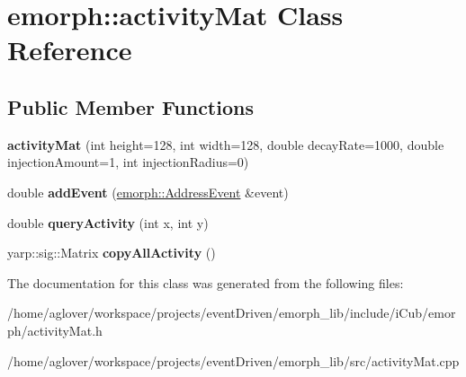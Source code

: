 \hypertarget{classemorph_1_1activityMat}{\section{emorph\-:\-:activity\-Mat Class Reference}
\label{classemorph_1_1activityMat}
}
\subsection*{Public Member Functions}
\begin{DoxyCompactItemize}
\item 
\hypertarget{classemorph_1_1activityMat_aa691fac5518d0aebbf478ca608c0eea5}{{\bfseries activity\-Mat} (int height=128, int width=128, double decay\-Rate=1000, double injection\-Amount=1, int injection\-Radius=0)}\label{classemorph_1_1activityMat_aa691fac5518d0aebbf478ca608c0eea5}

\item 
\hypertarget{classemorph_1_1activityMat_a6d9bad36055b34b570b9e95ba7db3e8d}{double {\bfseries add\-Event} (\hyperlink{classemorph_1_1AddressEvent}{emorph\-::\-Address\-Event} \&event)}\label{classemorph_1_1activityMat_a6d9bad36055b34b570b9e95ba7db3e8d}

\item 
\hypertarget{classemorph_1_1activityMat_a017a37a8eaba4b23acbc7e8a8f5de528}{double {\bfseries query\-Activity} (int x, int y)}\label{classemorph_1_1activityMat_a017a37a8eaba4b23acbc7e8a8f5de528}

\item 
\hypertarget{classemorph_1_1activityMat_a8bd6d788a299ebaf8da6dd0ccfb5ddb3}{yarp\-::sig\-::\-Matrix {\bfseries copy\-All\-Activity} ()}\label{classemorph_1_1activityMat_a8bd6d788a299ebaf8da6dd0ccfb5ddb3}

\end{DoxyCompactItemize}


The documentation for this class was generated from the following files\-:\begin{DoxyCompactItemize}
\item 
/home/aglover/workspace/projects/event\-Driven/emorph\-\_\-lib/include/i\-Cub/emorph/activity\-Mat.\-h\item 
/home/aglover/workspace/projects/event\-Driven/emorph\-\_\-lib/src/activity\-Mat.\-cpp\end{DoxyCompactItemize}
